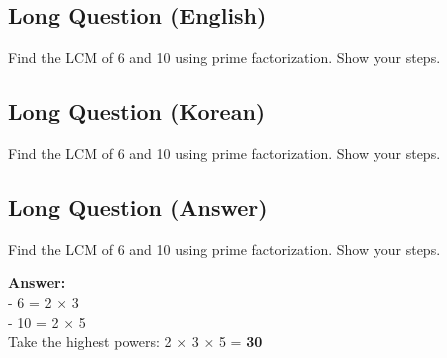 \cleardoublepage
\subsection*{Long Question (English)}
Find the LCM of 6 and 10 using prime factorization. Show your steps.


\newpage
\subsection*{Long Question (Korean)}
Find the LCM of 6 and 10 using prime factorization. Show your steps.


\newpage
\subsection*{Long Question (Answer)}
Find the LCM of 6 and 10 using prime factorization. Show your steps.

\textbf{Answer:}\\
- 6 = 2 × 3\\
- 10 = 2 × 5\\
Take the highest powers: 2 × 3 × 5 = \textbf{30}
